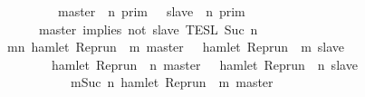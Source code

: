 \begin{isabellebody}
{}\isanewline
\ \ \ \ \ \ \ \ {\isasymunion}\ {\isasymlbrakk}\ master\ {\isasymUp}\ n\ {\isasymrbrakk}\isactrlsub p\isactrlsub r\isactrlsub i\isactrlsub m\ {\isasyminter}\ {\isasymlbrakk}\ slave\ {\isasymnot}{\isasymUp}\ n\ {\isasymrbrakk}\isactrlsub p\isactrlsub r\isactrlsub i\isactrlsub m{\isacharparenright}\ \ %
\isanewline
\ \ \ \ \ {\isasyminter}\ {\isasymlbrakk}\ master\ implies\ not\ slave\ {\isasymrbrakk}\isactrlsub T\isactrlsub E\isactrlsub S\isactrlsub L\isactrlbsup {\isasymge}\ Suc\ n\isactrlesup {\isacartoucheclose}\isanewline
%
\isadelimproof
%
\endisadelimproof
%
\isatagproof
{}\isamarkupfalse%
\ {\isacharminus}\isanewline
\ \ \isamarkupfalse%
\ {\isacartoucheopen}{\isacharbraceleft}{\isasymrho}{\isachardot}\ {\isasymforall}m{\isasymge}n{\isachardot}\ hamlet\ {\isacharparenleft}{\isacharparenleft}Rep{\isacharunderscore}run\ {\isasymrho}{\isacharparenright}\ m\ master{\isacharparenright}\ {\isasymlongrightarrow}\ {\isasymnot}\ hamlet\ {\isacharparenleft}{\isacharparenleft}Rep{\isacharunderscore}run\ {\isasymrho}{\isacharparenright}\ m\ slave{\isacharparenright}{\isacharbraceright}\isanewline
\ \ \ \ \ \ \ {\isacharequal}\ {\isacharbraceleft}{\isasymrho}{\isachardot}\ hamlet\ {\isacharparenleft}{\isacharparenleft}Rep{\isacharunderscore}run\ {\isasymrho}{\isacharparenright}\ n\ master{\isacharparenright}\ {\isasymlongrightarrow}\ {\isasymnot}\ hamlet\ {\isacharparenleft}{\isacharparenleft}Rep{\isacharunderscore}run\ {\isasymrho}{\isacharparenright}\ n\ slave{\isacharparenright}{\isacharbraceright}\isanewline
\ \ \ \ \ \ \ \ \ \ {\isasyminter}\ {\isacharbraceleft}{\isasymrho}{\isachardot}\ {\isasymforall}m{\isasymge}Suc\ n{\isachardot}\ hamlet\ {\isacharparenleft}{\isacharparenleft}Rep{\isacharunderscore}run\ {\isasymrho}{\isacharparenright}\ m\ master{\isacharparenright}\isanewline

\end{isabellebody}
